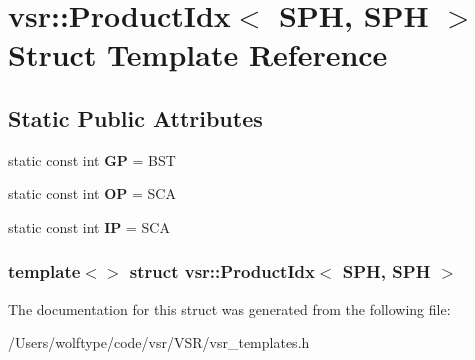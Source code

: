 \hypertarget{structvsr_1_1_product_idx_3_01_s_p_h_00_01_s_p_h_01_4}{\section{vsr\-:\-:Product\-Idx$<$ S\-P\-H, S\-P\-H $>$ Struct Template Reference}
\label{structvsr_1_1_product_idx_3_01_s_p_h_00_01_s_p_h_01_4}
}
\subsection*{Static Public Attributes}
\begin{DoxyCompactItemize}
\item 
\hypertarget{structvsr_1_1_product_idx_3_01_s_p_h_00_01_s_p_h_01_4_a9df6f0662563db95f281a956ba083d4f}{static const int {\bfseries G\-P} = B\-S\-T}\label{structvsr_1_1_product_idx_3_01_s_p_h_00_01_s_p_h_01_4_a9df6f0662563db95f281a956ba083d4f}

\item 
\hypertarget{structvsr_1_1_product_idx_3_01_s_p_h_00_01_s_p_h_01_4_aa7f3d991b1f7a784118ac746c4f793e0}{static const int {\bfseries O\-P} = S\-C\-A}\label{structvsr_1_1_product_idx_3_01_s_p_h_00_01_s_p_h_01_4_aa7f3d991b1f7a784118ac746c4f793e0}

\item 
\hypertarget{structvsr_1_1_product_idx_3_01_s_p_h_00_01_s_p_h_01_4_a1d4d950c8071200eed95db17c47bab55}{static const int {\bfseries I\-P} = S\-C\-A}\label{structvsr_1_1_product_idx_3_01_s_p_h_00_01_s_p_h_01_4_a1d4d950c8071200eed95db17c47bab55}

\end{DoxyCompactItemize}
\subsubsection*{template$<$$>$ struct vsr\-::\-Product\-Idx$<$ S\-P\-H, S\-P\-H $>$}



The documentation for this struct was generated from the following file\-:\begin{DoxyCompactItemize}
\item 
/\-Users/wolftype/code/vsr/\-V\-S\-R/vsr\-\_\-templates.\-h\end{DoxyCompactItemize}

